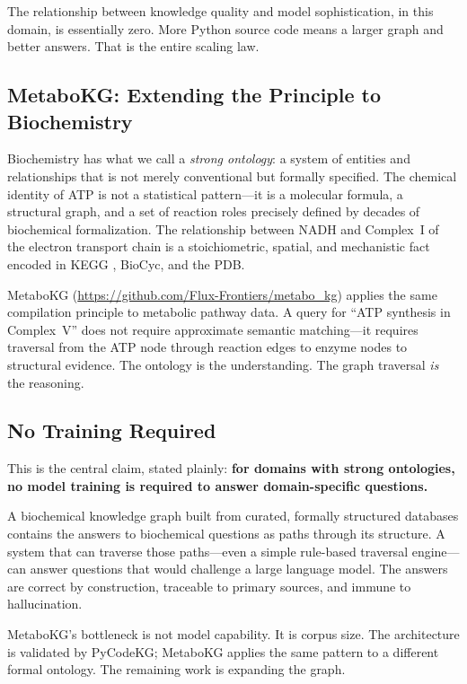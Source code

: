 \documentclass{article}
\begin{document}
The relationship between knowledge quality and model sophistication, in this
domain, is essentially zero.  More Python source code means a larger graph and
better answers.  That is the entire scaling law.

\subsection{MetaboKG: Extending the Principle to Biochemistry}

Biochemistry has what we call a \emph{strong ontology}: a system of entities and
relationships that is not merely conventional but formally specified.  The
chemical identity of ATP is not a statistical pattern---it is a molecular
formula, a structural graph, and a set of reaction roles precisely defined by
decades of biochemical formalization.  The relationship between NADH and
Complex~I of the electron transport chain is a stoichiometric, spatial, and
mechanistic fact encoded in KEGG \cite{kanehisa2023kegg}, BioCyc, and the PDB.

MetaboKG (\url{https://github.com/Flux-Frontiers/metabo\_kg}) applies the same
compilation principle to metabolic pathway data.  A query for ``ATP synthesis in
Complex~V'' does not require approximate semantic matching---it requires
traversal from the ATP node through reaction edges to enzyme nodes to structural
evidence.  The ontology is the understanding.  The graph traversal \emph{is} the
reasoning.

\subsection{No Training Required}

This is the central claim, stated plainly: \textbf{for domains with strong
ontologies, no model training is required to answer domain-specific questions.}

A biochemical knowledge graph built from curated, formally structured databases
contains the answers to biochemical questions as paths through its structure.  A
system that can traverse those paths---even a simple rule-based traversal
engine---can answer questions that would challenge a large language model.  The
answers are correct by construction, traceable to primary sources, and immune to
hallucination.

MetaboKG's bottleneck is not model capability.  It is corpus size.  The
architecture is validated by PyCodeKG; MetaboKG applies the same pattern to a
different formal ontology.  The remaining work is expanding the graph.
\end{document}
